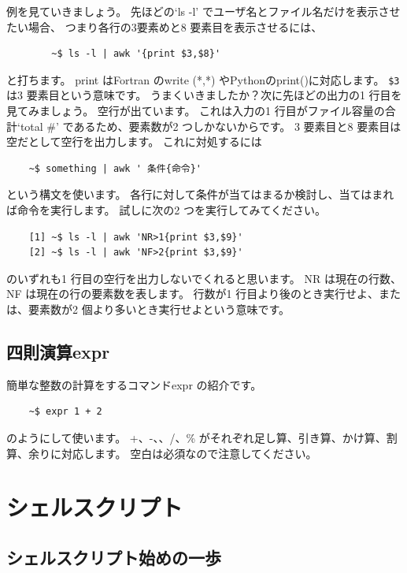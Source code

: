 \documentclass[a4j]{ltjsreport}
\begin{document}
    例を見ていきましょう。
    先ほどの`ls -l' でユーザ名とファイル名だけを表示させたい場合、
    つまり各行の3要素めと8 要素目を表示させるには、
    \begin{verbatim}
        ~$ ls -l | awk '{print $3,$8}'
    \end{verbatim}
    と打ちます。
    print はFortran のwrite (*,*) やPythonのprint()に対応します。
    \verb+$3+ は3 要素目という意味です。
    うまくいきましたか？次に先ほどの出力の1 行目を見てみましょう。
    空行が出ています。
    これは入力の1 行目がファイル容量の合計`total \#' であるため、要素数が2 つしかないからです。
    3 要素目と8 要素目は空だとして空行を出力します。
    これに対処するには
    \begin{verbatim}
    ~$ something | awk ' 条件{命令}'
    \end{verbatim}
    という構文を使います。
    各行に対して条件が当てはまるか検討し、当てはまれば命令を実行します。
    試しに次の2 つを実行してみてください。
    \begin{verbatim}
    [1] ~$ ls -l | awk 'NR>1{print $3,$9}'
    [2] ~$ ls -l | awk 'NF>2{print $3,$9}'
    \end{verbatim}
    のいずれも1 行目の空行を出力しないでくれると思います。
    NR は現在の行数、NF は現在の行の要素数を表します。
    行数が1 行目より後のとき実行せよ、または、要素数が2 個より多いとき実行せよという意味です。

    \section{四則演算expr}
    簡単な整数の計算をするコマンドexpr の紹介です。
    \begin{verbatim}
    ~$ expr 1 + 2
    \end{verbatim}
    のようにして使います。
    +、-、\*、/、\% がそれぞれ足し算、引き算、かけ算、割算、余りに対応します。
    空白は必須なので注意してください。





    \chapter{シェルスクリプト}
    \section{シェルスクリプト始めの一歩}
\end{document}
